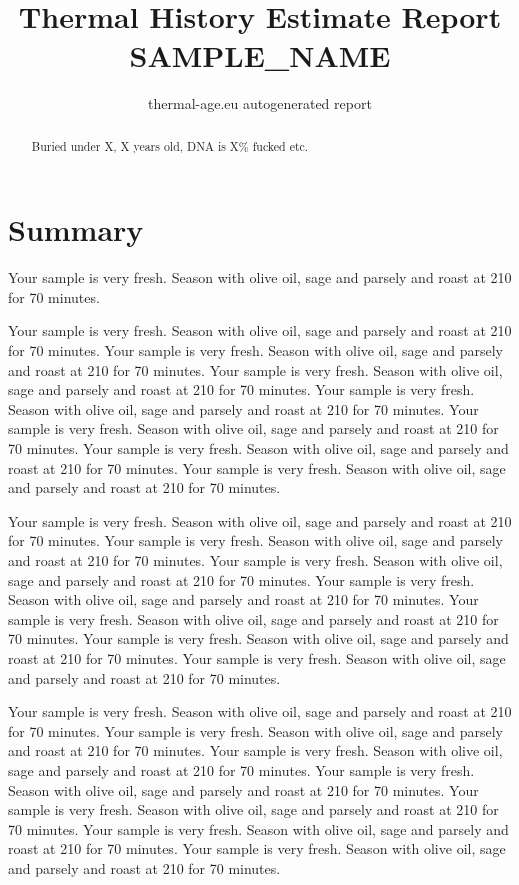 \documentclass[11pt,a4paper]{report}
\title{Thermal History Estimate Report SAMPLE\_NAME}
\author{thermal-age.eu autogenerated report}
\begin{document}
\maketitle

\begin{abstract}
Buried under X, X years old, DNA is X\% fucked etc.
\end{abstract}


\chapter{Summary}
Your sample is very fresh. Season with olive oil, sage and parsely and roast at 210 for 70 minutes.



Your sample is very fresh. Season with olive oil, sage and parsely and roast at 210 for 70 minutes. Your sample is very fresh. Season with olive oil, sage and parsely and roast at 210 for 70 minutes. Your sample is very fresh. Season with olive oil, sage and parsely and roast at 210 for 70 minutes. Your sample is very fresh. Season with olive oil, sage and parsely and roast at 210 for 70 minutes. Your sample is very fresh. Season with olive oil, sage and parsely and roast at 210 for 70 minutes. Your sample is very fresh. Season with olive oil, sage and parsely and roast at 210 for 70 minutes. Your sample is very fresh. Season with olive oil, sage and parsely and roast at 210 for 70 minutes.

Your sample is very fresh. Season with olive oil, sage and parsely and roast at 210 for 70 minutes. Your sample is very fresh. Season with olive oil, sage and parsely and roast at 210 for 70 minutes. Your sample is very fresh. Season with olive oil, sage and parsely and roast at 210 for 70 minutes. Your sample is very fresh. Season with olive oil, sage and parsely and roast at 210 for 70 minutes. Your sample is very fresh. Season with olive oil, sage and parsely and roast at 210 for 70 minutes. Your sample is very fresh. Season with olive oil, sage and parsely and roast at 210 for 70 minutes. Your sample is very fresh. Season with olive oil, sage and parsely and roast at 210 for 70 minutes.

Your sample is very fresh. Season with olive oil, sage and parsely and roast at 210 for 70 minutes. Your sample is very fresh. Season with olive oil, sage and parsely and roast at 210 for 70 minutes. Your sample is very fresh. Season with olive oil, sage and parsely and roast at 210 for 70 minutes. Your sample is very fresh. Season with olive oil, sage and parsely and roast at 210 for 70 minutes. Your sample is very fresh. Season with olive oil, sage and parsely and roast at 210 for 70 minutes. Your sample is very fresh. Season with olive oil, sage and parsely and roast at 210 for 70 minutes. Your sample is very fresh. Season with olive oil, sage and parsely and roast at 210 for 70 minutes.
\end{document}
